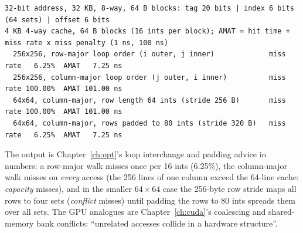 \documentclass[10pt,a4paper,openany,oneside]{report}
\begin{document}
\begin{lstlisting}[style=out,basicstyle=\ttfamily\fontsize{7.2}{8.6}\selectfont,title={Captured output}]
32-bit address, 32 KB, 8-way, 64 B blocks: tag 20 bits | index 6 bits (64 sets) | offset 6 bits
4 KB 4-way cache, 64 B blocks (16 ints per block); AMAT = hit time + miss rate x miss penalty (1 ns, 100 ns)
  256x256, row-major loop order (i outer, j inner)             miss rate   6.25%  AMAT   7.25 ns
  256x256, column-major loop order (j outer, i inner)          miss rate 100.00%  AMAT 101.00 ns
  64x64, column-major, row length 64 ints (stride 256 B)       miss rate 100.00%  AMAT 101.00 ns
  64x64, column-major, rows padded to 80 ints (stride 320 B)   miss rate   6.25%  AMAT   7.25 ns
\end{lstlisting}
The output is Chapter~\ref{ch:opt}'s loop interchange and padding advice in numbers: a row-major walk misses once per 16 ints (6.25\%), the column-major walk misses on \emph{every} access (the 256 lines of one column exceed the 64-line cache: \emph{capacity} misses), and in the smaller $64\times64$ case the 256-byte row stride maps all rows to four sets (\emph{conflict} misses) until padding the rows to 80 ints spreads them over all sets. The GPU analogues are Chapter~\ref{ch:cuda}'s coalescing and shared-memory bank conflicts: ``unrelated accesses collide in a hardware structure''.
\end{document}
